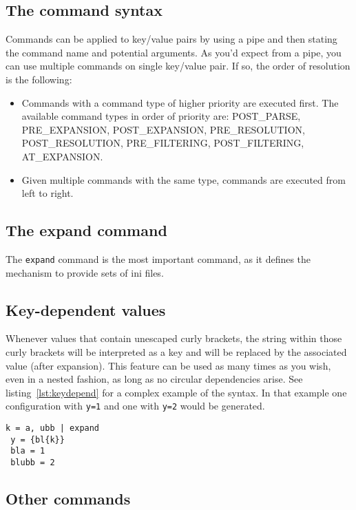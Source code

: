 \documentclass[11pt]{article}
\begin{document}
\subsection{The command syntax}

Commands can be applied to key/value pairs by using a pipe and then stating the command name and potential arguments. As you'd expect from a pipe, you can use multiple commands on single key/value pair. If so, the order of resolution is the following:
\begin{itemize}
 \item Commands with a command type of higher priority are executed first. The available command types in order of priority are: POST\_PARSE, PRE\_EXPANSION, POST\_EXPANSION, PRE\_RESOLUTION, POST\_RESOLUTION, PRE\_FILTERING, POST\_FILTERING, AT\_EXPANSION.
 \item Given multiple commands with the same type, commands are executed from left to right.
\end{itemize}

\subsection{The expand command}

The \lstinline!expand! command is the most important command, as it defines the mechanism to provide sets of ini files.
\subsection{Key-dependent values}
\label{sec:keydepend}

Whenever values that contain unescaped curly brackets, the string within those curly brackets will be interpreted as a key and will be replaced by the associated value (after expansion). This feature can be used as many times as you wish, even in a nested fashion, as long as no circular dependencies arise. See listing~\ref{lst:keydepend} for a complex example of the syntax. In that example one configuration with \lstinline!y=1! and one with \lstinline!y=2! would be generated.

\begin{lstlisting}[caption={A complex example of key-dependent value syntax},label=lst:keydepend]
 k = a, ubb | expand
 y = {bl{k}}
 bla = 1
 blubb = 2
\end{lstlisting}

\subsection{Other commands}
\end{document}
